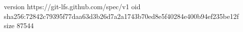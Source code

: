 version https://git-lfs.github.com/spec/v1
oid sha256:72842c79395f77daa63d3b26d7a2a1743b70ed8e5f40284e400b94ef235be12f
size 87544
